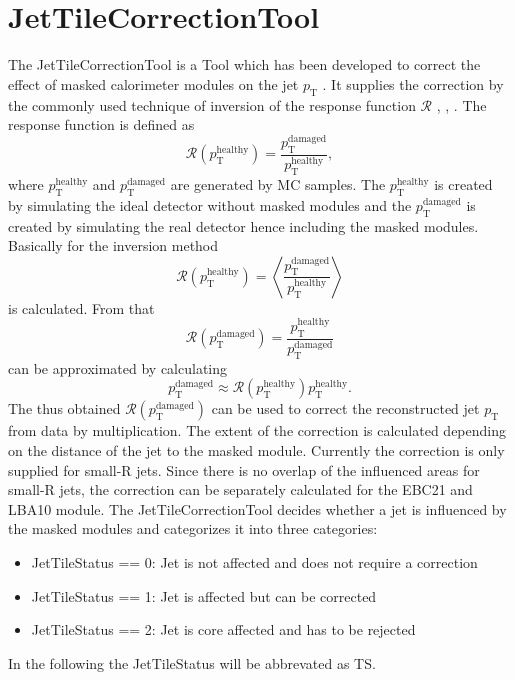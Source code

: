 \section{JetTileCorrectionTool}
The JetTileCorrectionTool is a Tool which has been developed to correct the effect of masked calorimeter modules on the jet $p_{\text{T}}$ \cite{RodriguezPerez:2126928}.
It supplies the correction by the commonly used technique of inversion of the response function $\mathcal{R}$ \cite{Aad:2014bia}, \cite{LopezMateos:1201006}, \cite{Marshall:1111434}.
The response function is defined as
\begin{equation}
	\mathcal{R}(p_{\text{T}}^{\text{healthy}}) = \frac{p_{\text{T}}^{\text{damaged}}}{p_{\text{T}}^{\text{healthy}}},
\end{equation}
where $p_{\text{T}}^{\text{healthy}}$ and $p_{\text{T}}^{\text{damaged}}$ are generated by MC samples.
The $p_{\text{T}}^{\text{healthy}}$ is created by simulating the ideal detector without masked modules and the $p_{\text{T}}^{\text{damaged}}$ is created by simulating the real detector hence including the masked modules.
Basically for the inversion method
\begin{equation}
\mathcal{R}(p_{\text{T}}^{\text{healthy}}) = \left< \frac{p_{\text{T}}^{\text{damaged}}}{p_{\text{T}}^{\text{healthy}}}\right>
\end{equation}
is calculated.
From that
\begin{equation}
	\mathcal{R}(p_{\text{T}}^{\text{damaged}}) = \frac{p_{\text{T}}^{\text{healthy}}}{p_{\text{T}}^{\text{damaged}}}	
\end{equation}
can be approximated by calculating
\begin{equation}
	p_{\text{T}}^{\text{damaged}} \approx \mathcal{R}(p_{\text{T}}^{\text{healthy}}) p_{\text{T}}^{\text{healthy}}.
\end{equation}
The thus obtained $\mathcal{R}(p_{\text{T}}^{\text{damaged}})$ can be used to correct the reconstructed jet $p_{\text{T}}$ from data by multiplication.
The extent of the correction is calculated depending on the distance of the jet to the masked module.
Currently the correction is only supplied for small-R jets.
Since there is no overlap of the influenced areas for small-R jets, the correction can be separately calculated for the EBC21 and LBA10 module.
The JetTileCorrectionTool decides whether a jet is influenced by the masked modules and categorizes it into three categories:
\begin{itemize}
\item JetTileStatus == 0: Jet is not affected and does not require a correction
\item JetTileStatus == 1: Jet is affected but can be corrected
\item JetTileStatus == 2: Jet is core affected and has to be rejected
\end{itemize}
In the following the JetTileStatus will be abbrevated as TS.
